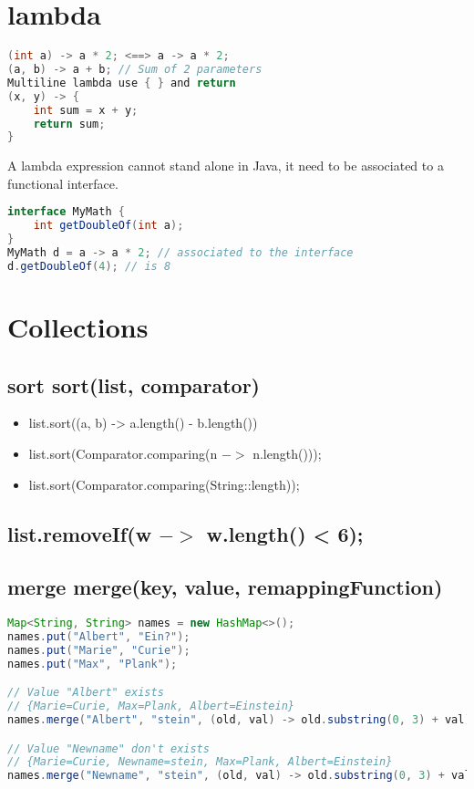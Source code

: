 \section{lambda}

\begin{lstlisting}[language=Java]
(int a) -> a * 2; <==> a -> a * 2;
(a, b) -> a + b; // Sum of 2 parameters
Multiline lambda use { } and return
(x, y) -> {
	int sum = x + y;
	return sum;
}
\end{lstlisting}

A lambda expression cannot stand alone in Java, it need to be associated to a functional interface.

\begin{lstlisting}[language=Java]
interface MyMath {
    int getDoubleOf(int a);
}
MyMath d = a -> a * 2; // associated to the interface
d.getDoubleOf(4); // is 8
\end{lstlisting}

\section{Collections}

\subsection{sort sort(list, comparator)}
\begin{itemize}
\item{list.sort((a, b) -> a.length() - b.length())}
\item{list.sort(Comparator.comparing(n $->$ n.length()));}
\item{list.sort(Comparator.comparing(String::length));}
\end{itemize}

\subsection{list.\textbf{removeIf}(w $->$ w.length() < 6);}

\subsection{merge merge(key, value, remappingFunction)}

\begin{lstlisting}[language=Java]
Map<String, String> names = new HashMap<>();
names.put("Albert", "Ein?");
names.put("Marie", "Curie");
names.put("Max", "Plank");

// Value "Albert" exists
// {Marie=Curie, Max=Plank, Albert=Einstein}
names.merge("Albert", "stein", (old, val) -> old.substring(0, 3) + val);

// Value "Newname" don't exists
// {Marie=Curie, Newname=stein, Max=Plank, Albert=Einstein}
names.merge("Newname", "stein", (old, val) -> old.substring(0, 3) + val);
\end{lstlisting}

